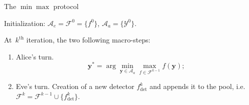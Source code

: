 \documentclass[10pt,aspectratio=169]{beamer}
\newcommand{\fdet}{f_{\mathrm{det}}}
\newcommand{\fset}{\mathcal{F}}
\DeclareMathOperator*{\argmin}{arg\,min} %
\begin{document}

    


\begin{frame}{The $\min\max$ protocol}

Initialization: $\mathcal{A}_e = \fset^{0} = \{f^0\}$,  $\mathcal{A}_a = \{\mathcal{Y}^0\}$.
\pause

At~$k^{\mathrm{th}}$ iteration, the two following macro-steps: 
\begin{enumerate}
	\item \alert<2>{Alice's turn.} 
	\begin{equation}
	\mathbf{y}^\ast = \arg \min_{\mathbf{y} \in \mathcal{A}_a} \max_{f \in \fset^{k-1}} f(\mathbf{y});
	\label{eq:stepone}	
	\end{equation}
    \pause
	\item Eve's turn. Creation of a new detector $\fdet^k$ and appends it to the pool, i.e. $\fset^k = \fset^{k-1} \cup \{\fdet^k\}.$
\end{enumerate}
\end{frame}


\end{document}
